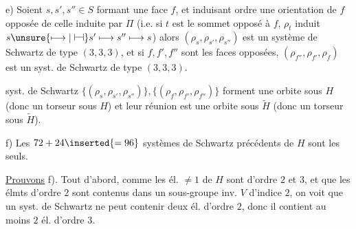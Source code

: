 
e) Soient  $s,s',s''\in S$ formant une face $f$, et induisant   ordre  une orientation de $f$ opposée de celle induite par $\Pi$ (i.e.  si $t$ est le sommet opposé à $f$, $\rho_t$ induit  $s\unsure{\longmapsto|\mathrel{\vdash\!\dashv}}s'\longmapsto s''\longmapsto s$) alors $(\rho_s,\rho_{s'},\rho_{s''})$ est un système de Schwartz de type $(3,3,3)$, et si $f,f',f''$ sont les faces opposées,  $(\rho_{f''},\rho_{f'},\rho_f)$ est un syst. de Schwartz de type $(3,3,3)$.




  syst. de Schwartz $\{(\rho_s,\rho_{s'},\rho_{s''})\},\{(\rho_f,\rho_{f'},\rho_{f''})\}$ forment  une orbite sous $H$ (donc un torseur sous $H$) et leur réunion est une orbite sous $\widetilde H$ (donc un torseur sous $\widetilde H$).


f) Les $72+24\inserted{=96}$ systèmes de Schwartz précédents de  $H$ sont les seuls.


\uline{Prouvons} f). Tout d'abord, comme les él. $\ne1$ de $H$ sont d'ordre $2$ et $3$, et que les élmts d'ordre $2$ sont contenus dans un sous-groupe inv. $V$ d'indice $2$, on voit que un syst. de Schwartz ne peut contenir deux él. d'ordre $2$, donc il contient au moins $2$ él. d'ordre $3$. 

